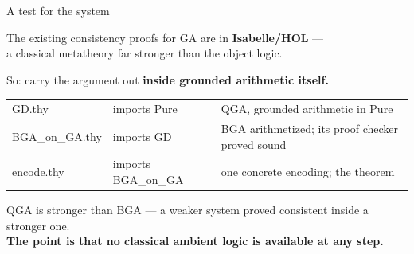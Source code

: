 \documentclass[aspectratio=169,11pt]{beamer}
\newcommand{\code}[1]{{\ttfamily\footnotesize #1}}
\newcommand{\key}[1]{{\color{accent}\textbf{#1}}}
\begin{document}
\begin{frame}{A test for the system}
  \vfill
  \begin{center}\large
    The existing consistency proofs for GA are in \key{Isabelle/HOL} ---\\
    a classical metatheory far stronger than the object logic.
  \end{center}
  \vfill
  \pause
  \begin{center}\Large
    So: carry the argument out \key{inside grounded arithmetic itself.}
  \end{center}
  \vfill
  \small
  \begin{center}
  \begin{tabular}{@{}lll@{}}
    \toprule
    \code{GD.thy}        & imports Pure          & QGA, grounded arithmetic in Pure \\
    \code{BGA\_on\_GA.thy} & imports \code{GD}     & BGA arithmetized; its proof checker
                                                    proved sound \\
    \code{encode.thy}    & imports \code{BGA\_on\_GA} & one concrete encoding; the theorem \\
    \bottomrule
  \end{tabular}
  \end{center}
  \vfill
  \pause
  \begin{center}\small
    QGA is stronger than BGA --- a weaker system proved consistent inside a
    stronger one.\\[0.3em]
    \key{The point is that no classical ambient logic is available at any step.}
  \end{center}
  \vfill
\end{frame}
\end{document}
